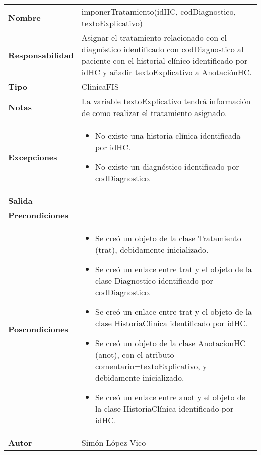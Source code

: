 \documentclass[11pt,a4paper]{article}
\begin{document}
\begin{table}[H]
	\centering
	\label{my-label}
	\begin{tabularx}{\textwidth}{l|X}
		\textbf{Nombre}          & imponerTratamiento(idHC, codDiagnostico, textoExplicativo)\\
		\textbf{Responsabilidad} & Asignar el tratamiento relacionado con el diagnóstico identificado con codDiagnostico al paciente con el historial clínico identificado por idHC y añadir textoExplicativo a AnotaciónHC.  \\
		\textbf{Tipo}            & ClinicaFIS \\
		\textbf{Notas}           & La variable textoExplicativo tendrá información de como realizar el tratamiento asignado. \\
		\textbf{Excepciones}     & 
		\begin{itemize}
			\item No existe una historia clínica identificada por idHC.
			\item No existe un diagnóstico identificado por codDiagnostico.
		\end{itemize} \\
		\textbf{Salida}          &  \\
		\textbf{Precondiciones}  &  \\
		\textbf{Poscondiciones}  &
		\begin{itemize}
			\item Se creó un objeto de la clase Tratamiento (trat), debidamente inicializado.
			\item Se creó un enlace entre trat y el objeto de la clase Diagnostico identificado por codDiagnostico. 
			\item Se creó un enlace entre trat y el objeto de la clase HistoriaClinica identificado por idHC.
			\item Se creó un objeto de la clase AnotacionHC (anot), con el atributo comentario=textoExplicativo, y debidamente inicializado.
			\item Se creó un enlace entre anot y el objeto de la clase HistoriaClínica identificado por idHC.
		\end{itemize} \\
		\textbf{Autor}			 & Simón López Vico
	\end{tabularx}
\end{table}
\end{document}

